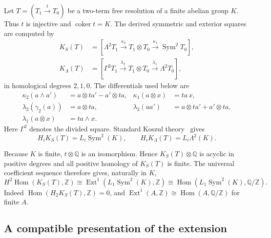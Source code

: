 \documentclass[11pt]{amsart}
\theoremstyle{remark}
\newcommand{\Z}{\mathbb Z}
\newcommand{\Q}{\mathbb Q}
\newcommand{\Sym}{\operatorname{Sym}}
\newcommand{\Hom}{\operatorname{Hom}}
\newcommand{\Ext}{\operatorname{Ext}}
\begin{document}
Let $T=(T_1\xrightarrow{t}T_0)$ be a two-term free resolution of a
finite abelian group $K$.  Thus $t$ is injective and
$\operatorname{coker}t=K$.  The derived symmetric and exterior squares
are computed by
\begin{align}
 K_S(T)&=\left[
 \Lambda^2T_1\xrightarrow{\kappa_2}
 T_1\otimes T_0\xrightarrow{\kappa_1}\Sym^2T_0
 \right],                                                   \label{eq:KS}\\
 K_\Lambda(T)&=\left[
 \Gamma^2T_1\xrightarrow{\lambda_2}
 T_1\otimes T_0\xrightarrow{\lambda_1}\Lambda^2T_0
 \right],                                                   \label{eq:KL}
\end{align}
in homological degrees $2,1,0$.  The differentials used below are
\begin{align*}
 \kappa_2(a\wedge a')&=a\otimes ta'-a'\otimes ta,
 &\kappa_1(a\otimes x)&=ta\,x,\\
 \lambda_2(\gamma_2(a))&=a\otimes ta,
 &\lambda_2(aa')&=a\otimes ta'+a'\otimes ta,\\
 \lambda_1(a\otimes x)&=ta\wedge x.
\end{align*}
Here $\Gamma^2$ denotes the divided square.  Standard Koszul
theory~\cite{Kock} gives
\[
 H_iK_S(T)=L_i\Sym^2(K),
 \qquad H_iK_\Lambda(T)=L_i\Lambda^2(K).
\]

Because $K$ is finite, $t\otimes\Q$ is an isomorphism.  Hence
$K_S(T)\otimes\Q$ is acyclic in positive degrees and all positive
homology of $K_S(T)$ is finite.  The universal coefficient sequence
therefore gives, naturally in $K$,
\begin{equation}\label{eq:UCT}
 H^2\Hom(K_S(T),\Z)
 \cong\Ext^1(L_1\Sym^2(K),\Z)
 \cong\Hom(L_1\Sym^2(K),\Q/\Z).
\end{equation}
Indeed $\Hom(H_2K_S(T),\Z)=0$, and
$\Ext^1(A,\Z)\cong\Hom(A,\Q/\Z)$ for finite $A$.

\subsection{A compatible presentation of the extension}
\end{document}
